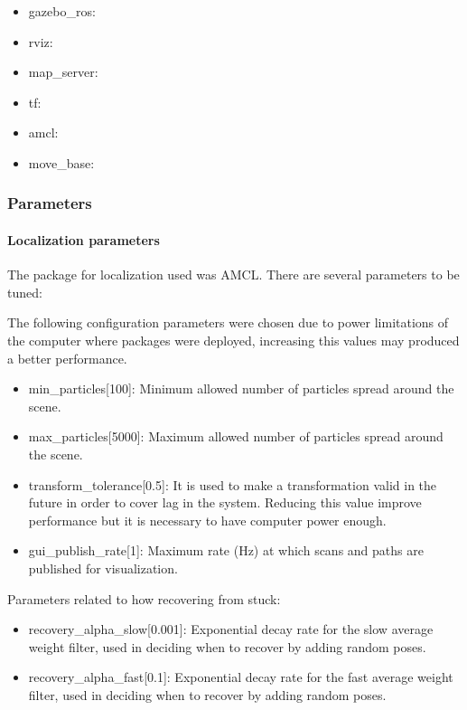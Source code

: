\documentclass[10pt,journal,compsoc]{IEEEtran}
\begin{document}
\begin{itemize}
\item gazebo\_ros:
\item rviz:
\item map\_server:
\item tf:
\item amcl:
\item move\_base: 
\end{itemize}

\subsubsection{Parameters}

\paragraph{Localization parameters}

The package for localization used was AMCL. There are several parameters to be tuned:

The following configuration parameters were chosen due to power limitations of the computer where packages were deployed, increasing this values may produced a better performance.

\begin{itemize}
\item min\_particles[100]: Minimum allowed number of particles spread around the scene.
\item max\_particles[5000]: Maximum allowed number of particles spread around the scene. 
\item transform\_tolerance[0.5]: It is used to make a transformation valid in the future in order to cover lag in the system. Reducing this value improve performance but it is necessary to have computer power enough.
\item gui\_publish\_rate[1]: Maximum rate (Hz) at which scans and paths are published for visualization.
\end{itemize}

Parameters related to how recovering from stuck:

\begin{itemize}
\item recovery\_alpha\_slow[0.001]: Exponential decay rate for the slow average weight filter, used in deciding when to recover by adding random poses.   
\item recovery\_alpha\_fast[0.1]: Exponential decay rate for the fast average weight filter, 
used in deciding when to recover by adding random poses.
\end{itemize}
\end{document}
